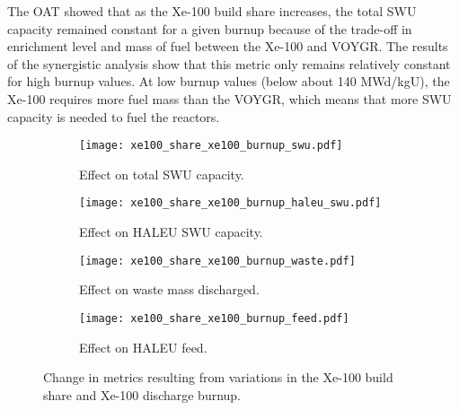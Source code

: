 The \gls{OAT} showed that as the Xe-100 build share increases, the 
total \gls{SWU} capacity remained constant for a given burnup because 
of the trade-off in enrichment level and mass of fuel between the Xe-100 
and VOYGR. The results of the synergistic analysis show that this 
metric only remains relatively constant for high burnup values. At 
low burnup values (below about 140 MWd/kgU), the Xe-100 requires more 
fuel mass than the VOYGR, which means that more \gls{SWU} capacity 
is needed to fuel the reactors. 

\begin{figure}    
    \begin{subfigure}[h!]{0.48\textwidth}
        \centering
        \texttt{[image: xe100\_share\_xe100\_burnup\_swu.pdf]}
        \caption{Effect on total SWU capacity.}
        \label{fig:xe100_share_xe100_burnup_swu}
    \end{subfigure}
    \hfill
    \begin{subfigure}[h!]{0.48\textwidth}
        \centering
        \texttt{[image: xe100\_share\_xe100\_burnup\_haleu\_swu.pdf]}
        \caption{Effect on HALEU SWU capacity.}
        \label{fig:xe100_share_xe100_burnup_haleu_swu}
    \end{subfigure}
    
    \begin{subfigure}[h!]{0.48\textwidth}
        \centering
        \texttt{[image: xe100\_share\_xe100\_burnup\_waste.pdf]}
        \caption{Effect on waste mass discharged.}
        \label{fig:xe100_share_xe100_burnup_waste}
    \end{subfigure}
    \hfill
    \begin{subfigure}[h!]{0.48\textwidth}
        \centering
        \texttt{[image: xe100\_share\_xe100\_burnup\_feed.pdf]}
        \caption{Effect on HALEU feed.}
        \label{fig:xe100_share_xe100_burnup_feed}
    \end{subfigure}
    \caption{Change in metrics resulting from variations in the 
    Xe-100 build share and Xe-100 discharge burnup.}
    \label{fig:xe100_share_xe100_burnup}
\end{figure}

